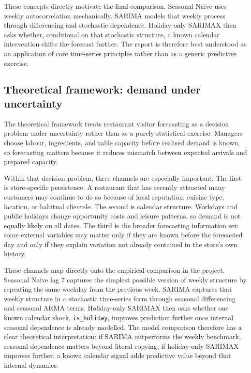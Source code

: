 \documentclass[11pt,oneside]{scrartcl}
\begin{document}
These concepts directly motivate the final comparison. Seasonal Naive uses weekly autocorrelation mechanically. SARIMA models that weekly process through differencing and stochastic dependence. Holiday-only SARIMAX then asks whether, conditional on that stochastic structure, a known calendar intervention shifts the forecast further. The report is therefore best understood as an application of core time-series principles rather than as a generic predictive exercise.

\subsection{Theoretical framework: demand under uncertainty}
The theoretical framework treats restaurant visitor forecasting as a decision problem under uncertainty rather than as a purely statistical exercise. Managers choose labour, ingredients, and table capacity before realised demand is known, so forecasting matters because it reduces mismatch between expected arrivals and prepared capacity.

Within that decision problem, three channels are especially important. The first is store-specific persistence. A restaurant that has recently attracted many customers may continue to do so because of local reputation, cuisine type, location, or habitual clientele. The second is calendar structure. Workdays and public holidays change opportunity costs and leisure patterns, so demand is not equally likely on all dates. The third is the broader forecasting information set: some external variables may matter only if they are known before the forecasted day and only if they explain variation not already contained in the store's own history.

These channels map directly onto the empirical comparison in the project. Seasonal Naive lag 7 captures the simplest possible version of weekly structure by repeating the same weekday from the previous week. SARIMA captures that weekly structure in a stochastic time-series form through seasonal differencing and seasonal ARMA terms. Holiday-only SARIMAX then asks whether one known calendar shock, \texttt{is\_holiday}, improves prediction further once internal seasonal dependence is already modelled. The model comparison therefore has a clear theoretical interpretation: if SARIMA outperforms the weekly benchmark, seasonal dependence matters beyond literal copying; if holiday-only SARIMAX improves further, a known calendar signal adds predictive value beyond that internal dynamics.
\end{document}
